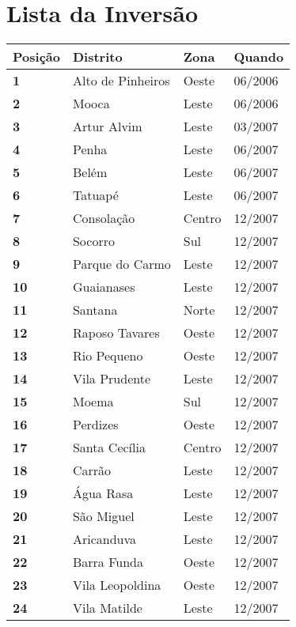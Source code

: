 \section{Lista da Inversão}

\begin{table}[H]
\centering
\begin{tabular}{l|l|l|l}
\textbf{Posição} & \textbf{Distrito} & \textbf{Zona} & \textbf{Quando} \\ \hline
\textbf{1} & Alto de Pinheiros & Oeste & 06/2006\\ \hline
\textbf{2} & Mooca & Leste & 06/2006\\ \hline
\textbf{3} & Artur Alvim & Leste & 03/2007\\ \hline
\textbf{4} & Penha & Leste & 06/2007\\ \hline
\textbf{5} & Belém & Leste & 06/2007\\ \hline
\textbf{6} & Tatuapé & Leste & 06/2007\\ \hline
\textbf{7} & Consolação & Centro & 12/2007\\ \hline
\textbf{8} & Socorro & Sul & 12/2007\\ \hline
\textbf{9} & Parque do Carmo & Leste & 12/2007\\ \hline
\textbf{10} & Guaianases & Leste & 12/2007\\ \hline
\textbf{11} & Santana & Norte & 12/2007\\ \hline
\textbf{12} & Raposo Tavares & Oeste & 12/2007\\ \hline
\textbf{13} & Rio Pequeno & Oeste & 12/2007\\ \hline
\textbf{14} & Vila Prudente & Leste & 12/2007\\ \hline
\textbf{15} & Moema & Sul & 12/2007\\ \hline
\textbf{16} & Perdizes & Oeste & 12/2007\\ \hline
\textbf{17} & Santa Cecília & Centro & 12/2007\\ \hline
\textbf{18} & Carrão & Leste & 12/2007\\ \hline
\textbf{19} & Água Rasa & Leste & 12/2007\\ \hline
\textbf{20} & São Miguel & Leste & 12/2007\\ \hline
\textbf{21} & Aricanduva & Leste & 12/2007\\ \hline
\textbf{22} & Barra Funda & Oeste & 12/2007\\ \hline
\textbf{23} & Vila Leopoldina & Oeste & 12/2007\\ \hline
\textbf{24} & Vila Matilde & Leste & 12/2007\\ \hline

\end{tabular}
\end{table}

